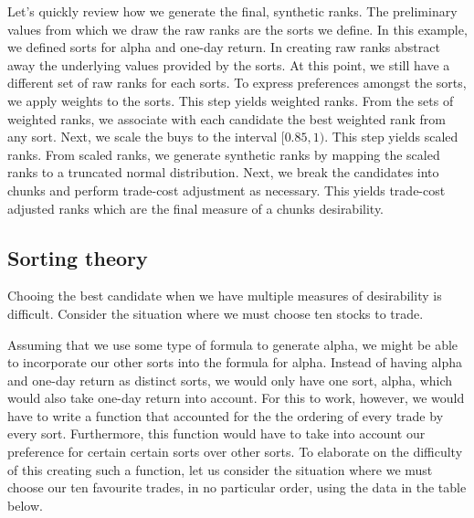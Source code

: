 \documentclass{article}
\begin{document}
Let's quickly review how we generate the final, synthetic ranks.  The
preliminary values from which we draw the raw ranks are the sorts we
define.  In this example, we defined sorts for alpha and one-day
return.  In creating raw ranks abstract away the underlying values
provided by the sorts.  At this point, we still have a different set
of raw ranks for each sorts.  To express preferences amongst the
sorts, we apply weights to the sorts.  This step yields weighted
ranks.  From the sets of weighted ranks, we associate with each
candidate the best weighted rank from any sort.  Next, we scale the
buys to the interval $[0.85,1)$.  This step yields scaled ranks.  From
scaled ranks, we generate synthetic ranks by mapping the scaled ranks
to a truncated normal distribution.  Next, we break the candidates
into chunks and perform trade-cost adjustment as necessary.  This
yields trade-cost adjusted ranks which are the final measure of a
chunks desirability.

\subsection{Sorting theory}
\label{sorting theory}

Chooing the best candidate when we have multiple measures of
desirability is difficult.  Consider the situation where we must
choose ten stocks to trade.

Assuming that we use some type of formula to generate alpha, we might
be able to incorporate our other sorts into the formula for alpha.
Instead of having alpha and one-day return as distinct sorts, we would
only have one sort, alpha, which would also take one-day return into
account.  For this to work, however, we would have to write a function
that accounted for the the ordering of every trade by every sort.
Furthermore, this function would have to take into account our
preference for certain certain sorts over other sorts.  To elaborate
on the difficulty of this creating such a function, let us consider
the situation where we must choose our ten favourite trades, in no
particular order, using the data in the table below.
\end{document}
